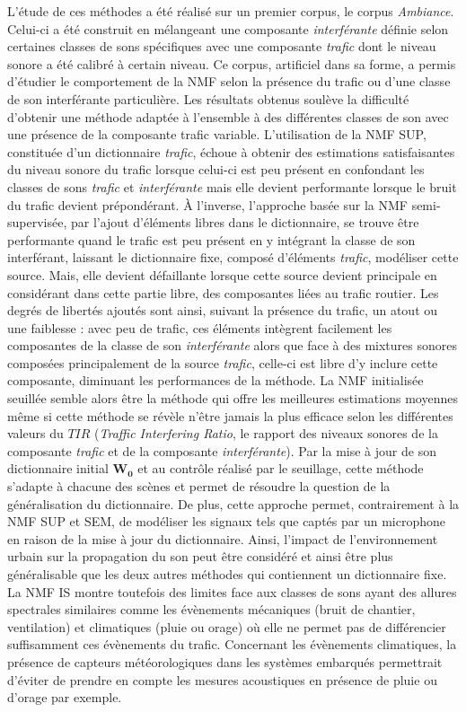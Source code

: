 L'étude de ces méthodes a été réalisé sur un premier corpus, le corpus \textit{Ambiance}. Celui-ci a été construit en mélangeant une composante \textit{interférante} définie selon certaines classes de sons spécifiques avec une composante \textit{trafic} dont le niveau sonore a été calibré à certain niveau. Ce corpus, artificiel dans sa forme, a permis d'étudier le comportement de la NMF selon la présence du trafic ou d'une classe de son interférante particulière. Les résultats obtenus soulève la difficulté d'obtenir une méthode adaptée à l'ensemble à des différentes classes de son avec une présence de la composante trafic variable.
L'utilisation de la NMF SUP, constituée d'un dictionnaire \textit{trafic}, échoue à obtenir des estimations satisfaisantes du niveau sonore du trafic lorsque celui-ci est peu présent en confondant les classes de sons \textit{trafic} et \textit{interférante} mais elle devient performante lorsque le bruit du trafic devient prépondérant.
À l'inverse, l'approche basée sur la NMF semi-supervisée, par l'ajout d'éléments libres dans le dictionnaire, se trouve être performante quand le trafic est peu présent en y intégrant la classe de son interférant, laissant le dictionnaire fixe, composé d'éléments \textit{trafic}, modéliser cette source.
Mais, elle devient défaillante lorsque cette source devient principale en considérant dans cette partie libre, des composantes liées au trafic routier. Les degrés de libertés ajoutés sont ainsi, suivant la présence du trafic, un atout ou une faiblesse : avec peu de trafic, ces éléments intègrent facilement les composantes de la classe de son \textit{interférante} alors que face à des mixtures sonores composées principalement de la source \textit{trafic}, celle-ci est libre d'y inclure cette composante, diminuant les performances de la méthode.
La NMF initialisée seuillée semble alors être la méthode qui offre les meilleures estimations moyennes même si cette méthode se révèle n'être jamais la plus efficace selon les différentes valeurs du $TIR$ (\textit{Traffic Interfering Ratio}, le rapport des niveaux sonores de la composante \textit{trafic} et de la composante \textit{interférante}). Par la mise à jour de son dictionnaire initial $\mathbf{W_0}$ et au contrôle réalisé par le seuillage, cette méthode s'adapte à chacune des scènes et permet de résoudre la question de la généralisation du dictionnaire. De plus, cette approche permet, contrairement à la NMF SUP et SEM, de modéliser les signaux tels que captés par un microphone en raison de la mise à jour du dictionnaire. Ainsi, l'impact de l'environnement urbain sur la propagation du son peut être considéré et ainsi être plus généralisable que les deux autres méthodes qui contiennent un dictionnaire fixe. La NMF IS montre toutefois des limites face aux classes de sons ayant des allures spectrales similaires comme les évènements mécaniques (bruit de chantier, ventilation) et climatiques (pluie ou orage) où elle ne permet pas de différencier suffisamment ces évènements du trafic. Concernant les évènements climatiques, la présence de capteurs météorologiques dans les systèmes embarqués permettrait d'éviter de prendre en compte les mesures acoustiques en présence de pluie ou d'orage par exemple.

